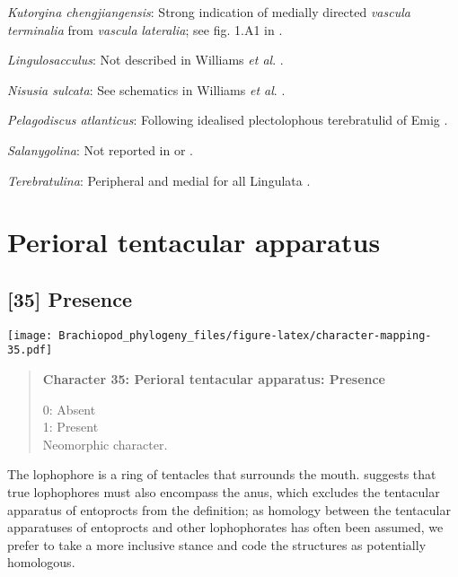 \documentclass[openany]{book}
\theoremstyle{definition}
\theoremstyle{definition}
\theoremstyle{definition}
\theoremstyle{remark}
\begin{document}
\hypertarget{Kutorgina_chengjiangensis-coding-34}{}
\emph{Kutorgina chengjiangensis}: Strong indication of medially directed
\emph{vascula} \emph{terminalia} from \emph{vascula} \emph{lateralia};
see fig. 1.A1 in \citet{Balthasar2009EarlyCambrian}.

\hypertarget{Lingulosacculus-coding-34}{}
\emph{Lingulosacculus}: Not described in Williams \emph{et al}.
\citeyearpar{Williams2000LinguliformeaCraniiformea}.

\hypertarget{Nisusia_sulcata-coding-34}{}
\emph{Nisusia sulcata}: See schematics in Williams \emph{et al}.
\citeyearpar{Williams2000LinguliformeaCraniiformea}.

\hypertarget{Pelagodiscus_atlanticus-coding-34}{}
\emph{Pelagodiscus atlanticus}: Following idealised plectolophous
terebratulid of Emig \citeyearpar{Emig1992Functionaldisposition}.

\hypertarget{Salanygolina-coding-34}{}
\emph{Salanygolina}: Not reported in
\citet{Havlicek1982LingulaceaPaterinacea} or
\citet{Williams2000LinguliformeaCraniiformea}.

\hypertarget{Terebratulina-coding-34}{}
\emph{Terebratulina}: Peripheral and medial for all Lingulata
\citep{Williams2000LinguliformeaCraniiformea}.

\section{Perioral tentacular
apparatus}\label{perioral-tentacular-apparatus}

\subsection*{{[}35{]} Presence}\label{presence-1}

\texttt{[image: Brachiopod\_phylogeny\_files/figure-latex/character-mapping-35.pdf]}

\begin{quote}
\textbf{Character 35: Perioral tentacular apparatus: Presence}

0: Absent\\
1: Present\\
Neomorphic character.
\end{quote}

The lophophore is a ring of tentacles that surrounds the mouth.
\citet{Temereva2017Innervationof} suggests that true lophophores must
also encompass the anus, which excludes the tentacular apparatus of
entoprocts from the definition; as homology between the tentacular
apparatuses of entoprocts and other lophophorates has often been
assumed, we prefer to take a more inclusive stance and code the
structures as potentially homologous.
\end{document}
